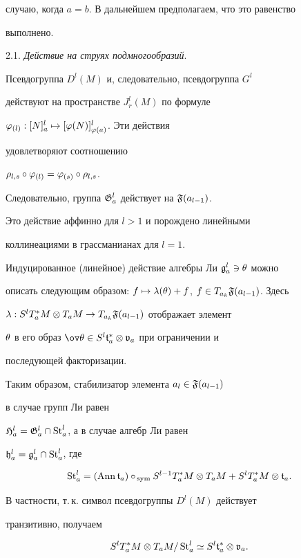 случаю, когда $a=b$. В дальнейшем предполагаем, что это равенство


выполнено.


\medskip





2.1. {\it Действие на струях подмногообразий}.


Псевдогруппа $D^l(M)$ и, следовательно, псевдогруппа $G^l$


действуют на пространстве $J^l_r(M)$ по формуле


$\varphi_{(l)}:[N]_a^l\mapsto[\varphi(N)]_{\varphi(a)}^l$. Эти действия


удовлетворяют соотношению


$\rho_{l,s}\circ\varphi_{(l)}=\varphi_{(s)}\circ\rho_{l,s}$.


Следовательно, группа $\frak{G}^l_a$ действует на ${\frak F}(a_{l-1})$.


Это действие аффинно для $l>1$ и  порождено линейными


коллинеациями в грассманианах для $l=1$.


Индуцированное (линейное) действие алгебры Ли ${\frak g}^l_a\ni\theta$ можно


описать следующим образом: $f\mapsto\ll(\te)+f$, $f\in


T_{a_k}\Fg(a_{l-1})$. Здесь


$\lambda:S^lT_a^*M\otimes T_aM\to T_{a_k}{\frak F}(a_{l-1})$ отображает элемент


$\theta$ в его образ $\ov\te\in S^l\tf^*_a\ot\vg_a$ при ограничении и


последующей факторизации.





Таким образом, стабилизатор элемента $a_l\in{\frak F}(a_{l-1})$


в случае групп Ли равен


${\frak H}^l_a=\frak{G}^l_a\cap\mathop{\mathrm{St}}\nolimits^l_a$, а в случае алгебр Ли равен


${\frak h}^l_a=\frak{g}^l_a\cap\mathop{\mathrm{St}}\nolimits^l_a$, где


$$


\St=(\Ann\tf_a)\circ_{\op{\,sym}}S^{l-1}T_a^*M\ot


T_aM+S^lT^*_aM\ot\tf_a.


$$


В частности, т.\,к. символ псевдогруппы $D^l(M)$ действует


транзитивно, получаем


\begin{equation}\label{zxc}


S^lT^*_aM\ot T_aM/\St\simeq S^l\tf^*_a\ot\vg_a.


\end{equation}





